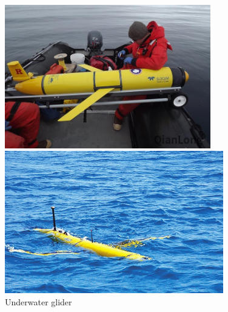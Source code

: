 \documentclass[12pt]{article}
\begin{document}
\begin{figure}[htb]
\begin{minipage}[t]{0.48\textwidth}
\centering
\includegraphics[width=0.8\textwidth]{fig1}
\end{minipage}
\begin{minipage}[t]{0.48\textwidth}
\centering
\includegraphics[width=0.85\textwidth]{fig2}
\end{minipage}
\caption{Underwater glider}\label{fig:und}
\end{figure}
\end{document}
